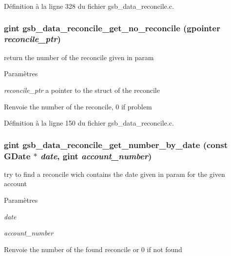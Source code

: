 Définition à la ligne 328 du fichier gsb\_\-data\_\-reconcile.c.

\subsubsection[{gsb\_\-data\_\-reconcile\_\-get\_\-no\_\-reconcile}]{\setlength{\rightskip}{0pt plus 5cm}gint gsb\_\-data\_\-reconcile\_\-get\_\-no\_\-reconcile (gpointer {\em reconcile\_\-ptr})}\label{gsb__data__reconcile_8h_a834a5ace0380c21559fb87cb88f7da80}
return the number of the reconcile given in param


\begin{DoxyParams}{Paramètres}
\item[{\em reconcile\_\-ptr}]a pointer to the struct of the reconcile\end{DoxyParams}
\begin{DoxyReturn}{Renvoie}
the number of the reconcile, 0 if problem 
\end{DoxyReturn}


Définition à la ligne 150 du fichier gsb\_\-data\_\-reconcile.c.

\subsubsection[{gsb\_\-data\_\-reconcile\_\-get\_\-number\_\-by\_\-date}]{\setlength{\rightskip}{0pt plus 5cm}gint gsb\_\-data\_\-reconcile\_\-get\_\-number\_\-by\_\-date (const GDate $\ast$ {\em date}, \/  gint {\em account\_\-number})}\label{gsb__data__reconcile_8h_a8b5fef84e7618bcd6f6ac22f28fbbbdd}
try to find a reconcile wich contains the date given in param for the given account


\begin{DoxyParams}{Paramètres}
\item[{\em date}]\item[{\em account\_\-number}]\end{DoxyParams}
\begin{DoxyReturn}{Renvoie}
the number of the found reconcile or 0 if not found 
\end{DoxyReturn}


